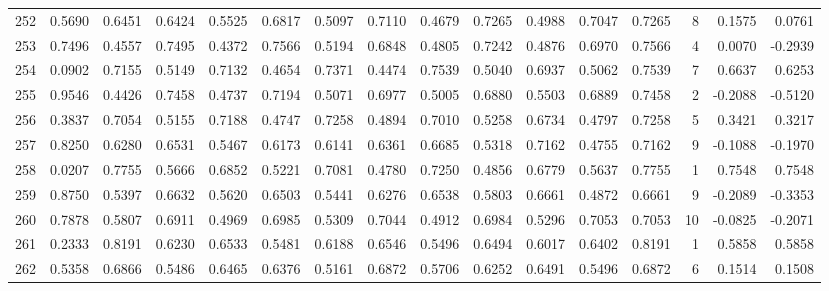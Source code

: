 \begin{tabular}{lrrrrrrrrrrrrrrr}
252 &      0.5690 &  0.6451 &  0.6424 &  0.5525 &  0.6817 &  0.5097 &  0.7110 &  0.4679 &  0.7265 &  0.4988 &   0.7047 &     0.7265 &      8 &                    0.1575 &                     0.0761 \\
253 &      0.7496 &  0.4557 &  0.7495 &  0.4372 &  0.7566 &  0.5194 &  0.6848 &  0.4805 &  0.7242 &  0.4876 &   0.6970 &     0.7566 &      4 &                    0.0070 &                    -0.2939 \\
254 &      0.0902 &  0.7155 &  0.5149 &  0.7132 &  0.4654 &  0.7371 &  0.4474 &  0.7539 &  0.5040 &  0.6937 &   0.5062 &     0.7539 &      7 &                    0.6637 &                     0.6253 \\
255 &      0.9546 &  0.4426 &  0.7458 &  0.4737 &  0.7194 &  0.5071 &  0.6977 &  0.5005 &  0.6880 &  0.5503 &   0.6889 &     0.7458 &      2 &                   -0.2088 &                    -0.5120 \\
256 &      0.3837 &  0.7054 &  0.5155 &  0.7188 &  0.4747 &  0.7258 &  0.4894 &  0.7010 &  0.5258 &  0.6734 &   0.4797 &     0.7258 &      5 &                    0.3421 &                     0.3217 \\
257 &      0.8250 &  0.6280 &  0.6531 &  0.5467 &  0.6173 &  0.6141 &  0.6361 &  0.6685 &  0.5318 &  0.7162 &   0.4755 &     0.7162 &      9 &                   -0.1088 &                    -0.1970 \\
258 &      0.0207 &  0.7755 &  0.5666 &  0.6852 &  0.5221 &  0.7081 &  0.4780 &  0.7250 &  0.4856 &  0.6779 &   0.5637 &     0.7755 &      1 &                    0.7548 &                     0.7548 \\
259 &      0.8750 &  0.5397 &  0.6632 &  0.5620 &  0.6503 &  0.5441 &  0.6276 &  0.6538 &  0.5803 &  0.6661 &   0.4872 &     0.6661 &      9 &                   -0.2089 &                    -0.3353 \\
260 &      0.7878 &  0.5807 &  0.6911 &  0.4969 &  0.6985 &  0.5309 &  0.7044 &  0.4912 &  0.6984 &  0.5296 &   0.7053 &     0.7053 &     10 &                   -0.0825 &                    -0.2071 \\
261 &      0.2333 &  0.8191 &  0.6230 &  0.6533 &  0.5481 &  0.6188 &  0.6546 &  0.5496 &  0.6494 &  0.6017 &   0.6402 &     0.8191 &      1 &                    0.5858 &                     0.5858 \\
262 &      0.5358 &  0.6866 &  0.5486 &  0.6465 &  0.6376 &  0.5161 &  0.6872 &  0.5706 &  0.6252 &  0.6491 &   0.5496 &     0.6872 &      6 &                    0.1514 &                     0.1508 \\

\end{tabular}
